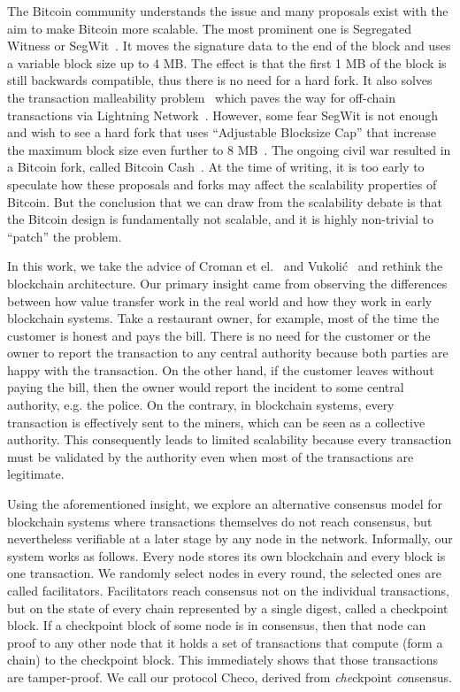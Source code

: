 The Bitcoin community understands the issue and many proposals exist with the aim to make Bitcoin more scalable.
The most prominent one is Segregated Witness or SegWit~\cite{segwit}.
It moves the signature data to the end of the block and uses a variable block size up to 4 MB.
The effect is that the first 1 MB of the block is still backwards compatible, thus there is no need for a hard fork.
It also solves the transaction malleability problem~\cite{bitcoinmalleability} which paves the way for off-chain transactions via Lightning Network~\cite{lightningnetwork}.
However, some fear SegWit is not enough and wish to see a hard fork that uses ``Adjustable Blocksize Cap'' that increase the maximum block size even further to 8 MB~\cite{bitcoincash}.
The ongoing civil war resulted in a Bitcoin fork, called Bitcoin Cash~\cite{bitcoincasharticle}.
At the time of writing, it is too early to speculate how these proposals and forks may affect the scalability properties of Bitcoin.
But the conclusion that we can draw from the scalability debate is that the Bitcoin design is fundamentally not scalable,
and it is highly non-trivial to ``patch'' the problem.

In this work, we take the advice of Croman et el.~\cite{croman2016scaling} and Vukoli\'{c}~\cite{vukolic2015quest} and rethink the blockchain architecture.
Our primary insight came from observing the differences between how value transfer work in the real world and how they work in early blockchain systems.
Take a restaurant owner, for example,
most of the time the customer is honest and pays the bill.
There is no need for the customer or the owner to report the transaction to any central authority 
because both parties are happy with the transaction.
On the other hand, if the customer leaves without paying the bill,
then the owner would report the incident to some central authority, e.g. the police.
On the contrary, in blockchain systems, every transaction is effectively sent to the miners,
which can be seen as a collective authority.
This consequently leads to limited scalability because every transaction must be validated by the authority even when most of the transactions are legitimate.

Using the aforementioned insight,
we explore an alternative consensus model for blockchain systems where transactions themselves do not reach consensus,
but nevertheless verifiable at a later stage by any node in the network.
Informally, our system works as follows.
Every node stores its own blockchain and every block is one transaction.
We randomly select nodes in every round, the selected ones are called facilitators.
Facilitators reach consensus not on the individual transactions,
but on the state of every chain represented by a single digest, called a checkpoint block.
If a checkpoint block of some node is in consensus, 
then that node can proof to any other node that it holds a set of transactions that compute (form a chain) to the checkpoint block.
This immediately shows that those transactions are tamper-proof.
We call our protocol Checo, derived from \emph{che}ckpoint \emph{co}nsensus.

